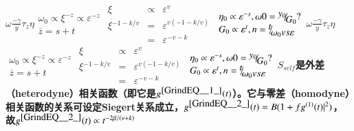 \documentclass{article} %
\begin{document}
{\bf $\omega \frac{-\gamma }{y} $$\tau _{z} $$\eta $$\begin{array}{l} {\omega _{0} \propto \xi ^{-z} \propto \varepsilon ^{-z} } \\ {\overline{z}=s+t} \end{array}$$\begin{array}{rcl} {\xi } & {\propto } & {\varepsilon ^{v} } \\ {\xi {}^{-1-k/v} } & {=} & {\varepsilon ^{v(-1-k/v)} } \\ {} & {=} & {\varepsilon ^{-v-k} } \end{array}$$\begin{array}{l} {\eta _{0} \propto \varepsilon ^{-s} ,\omega 0={\raise0.7ex\hbox{$ y_{0}  $}\!\mathord{\left/ {\vphantom {y_{0}  G_{0} }} \right. \kern-\nulldelimiterspace}\!\lower0.7ex\hbox{$ G_{0}  $}} ?} \\ {G_{0} \propto \varepsilon ^{t} ,n={\raise0.7ex\hbox{$ t $}\!\mathord{\left/ {\vphantom {t \omega _{0} vs\varepsilon }} \right. \kern-\nulldelimiterspace}\!\lower0.7ex\hbox{$ \omega _{0} vs\varepsilon  $}} } \end{array}$$\omega \frac{-\gamma }{y} $$\tau _{z} $$\eta $$\begin{array}{l} {\omega _{0} \propto \xi ^{-z} \propto \varepsilon ^{-z} } \\ {\overline{z}=s+t} \end{array}$$\begin{array}{rcl} {\xi } & {\propto } & {\varepsilon ^{v} } \\ {\xi {}^{-1-k/v} } & {=} & {\varepsilon ^{v(-1-k/v)} } \\ {} & {=} & {\varepsilon ^{-v-k} } \end{array}$$\begin{array}{l} {\eta _{0} \propto \varepsilon ^{-s} ,\omega 0={\raise0.7ex\hbox{$ y_{0}  $}\!\mathord{\left/ {\vphantom {y_{0}  G_{0} }} \right. \kern-\nulldelimiterspace}\!\lower0.7ex\hbox{$ G_{0}  $}} ?} \\ {G_{0} \propto \varepsilon ^{t} ,n={\raise0.7ex\hbox{$ t $}\!\mathord{\left/ {\vphantom {t \omega _{0} vs\varepsilon }} \right. \kern-\nulldelimiterspace}\!\lower0.7ex\hbox{$ \omega _{0} vs\varepsilon  $}} } \end{array}$$S_{self} $是外差（heterodyne）相关函数（即它是$g^{\eqref{GrindEQ__1_}} (t)$）。它与零差（homodyne）相关函数的关系可设定Siegert关系成立，$g^{\eqref{GrindEQ__2_}} (t)=B(1+fg^{(1)} (t)|^{2} )$，故$g^{\eqref{GrindEQ__2_}} (t)\propto t^{-2\beta /(\nu +k)} $}
\end{document}
